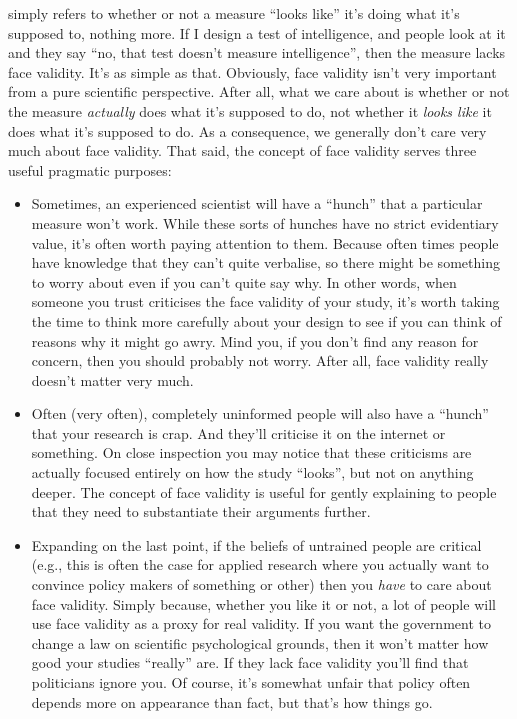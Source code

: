  simply refers to whether or not a measure ``looks like'' it's doing what it's supposed to, nothing more. If I design a test of intelligence, and people look at it and they say ``no, that test doesn't measure intelligence'', then the measure lacks face validity. It's as simple as that. Obviously, face validity isn't very important from a pure scientific perspective. After all, what we care about is whether or not the measure {\it actually} does what it's supposed to do, not whether it {\it looks like} it does what it's supposed to do. As a consequence, we generally don't care very much about face validity. That said, the concept of face validity serves three useful pragmatic  purposes:
\begin{itemize}
\item Sometimes, an experienced scientist will have a ``hunch'' that a particular measure won't work. While these sorts of hunches have no strict evidentiary value, it's often worth paying attention to them. Because often times people have knowledge that they can't quite verbalise, so there might be something to worry about even if you can't quite say why. In other words, when someone you trust criticises the face validity of your study, it's worth taking the time to think more carefully about your design to see if you can think of reasons why it might go awry. Mind you, if you don't find any reason for concern, then you should probably not worry. After all, face validity really doesn't matter very much.
\item Often (very often), completely uninformed people will also have a ``hunch'' that your research is crap. And they'll criticise it on the internet or something. On close inspection you may notice that these criticisms are actually focused entirely on how the study ``looks'', but not on anything deeper. The concept of face validity is useful for gently explaining to people that they need to substantiate their arguments further. 
\item Expanding on the last point, if the beliefs of untrained people are critical (e.g., this is often the case for applied research where you actually want to convince policy makers of something or other) then you {\it have} to care about face validity. Simply because, whether you like it or not, a lot of people will use face validity as a proxy for real validity. If you want the government to change a law on scientific psychological grounds, then it won't matter how good your studies ``really'' are. If they lack face validity you'll find that politicians ignore you. Of course, it's somewhat unfair that policy often depends more on appearance than fact, but that's how things go.
\end{itemize} 

